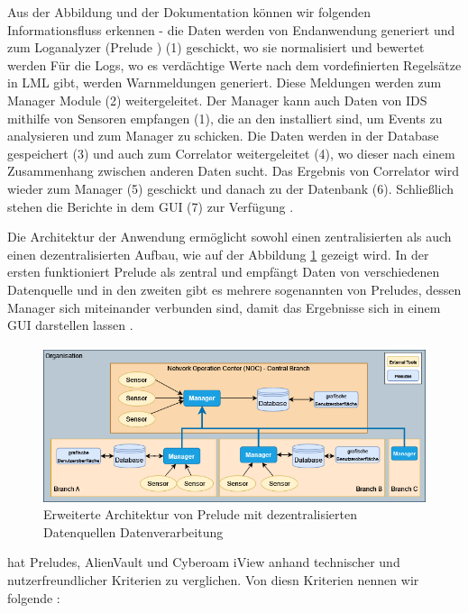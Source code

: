 Aus der Abbildung und der Dokumentation können wir folgenden Informationsfluss erkennen - die Daten werden von Endanwendung generiert und zum Loganalyzer (Prelude ) (1) geschickt, wo sie normalisiert und bewertet werden Für die Logs, wo es verdächtige Werte nach dem vordefinierten Regelsätze in \gls{LML} gibt, werden Warnmeldungen generiert. Diese Meldungen werden zum Manager Module (2) weitergeleitet. Der Manager kann auch Daten von \gls{IDS} mithilfe von Sensoren empfangen (1), die an den  installiert sind, um Events zu analysieren und zum Manager zu schicken. Die Daten werden in der Database gespeichert (3) und auch zum Correlator weitergeleitet (4), wo dieser nach einem Zusammenhang zwischen anderen Daten sucht. Das Ergebnis von Correlator wird wieder zum Manager (5) geschickt und danach zu der Datenbank (6). Schließlich stehen die Berichte in dem \gls{GUI} (7) zur Verfügung \citep{Prelude_Doc}.

Die Architektur der Anwendung ermöglicht sowohl einen zentralisierten als auch einen dezentralisierten Aufbau, wie auf der Abbildung \ref{fig:Prelude_erweitert} gezeigt wird. In der ersten funktioniert Prelude als zentral und empfängt Daten von verschiedenen Datenquelle und in den zweiten gibt es mehrere sogenannten  von Preludes, dessen Manager sich miteinander verbunden sind, damit das Ergebnisse sich in einem \gls{GUI} darstellen lassen \citep{Prelude_MU}.

\begin{figure}[H]
   \centering
   \includegraphics[width=1\textwidth]{assets/Branch_Prelude.drawio.png}
   \caption[Erweiterte Architektur von Prelude mit dezentralisierten Datenquellen und Datenverarbeitung]
   {Erweiterte Architektur von Prelude mit dezentralisierten Datenquellen Datenverarbeitung}
   \label{fig:Prelude_erweitert}
   \centering
\end{figure}

\cite{Grammatikis_Prelude} hat Preludes, AlienVault und Cyberoam iView anhand technischer und nutzerfreundlicher Kriterien zu verglichen. Von diesn Kriterien nennen wir folgende \citep{Grammatikis_Prelude}:

